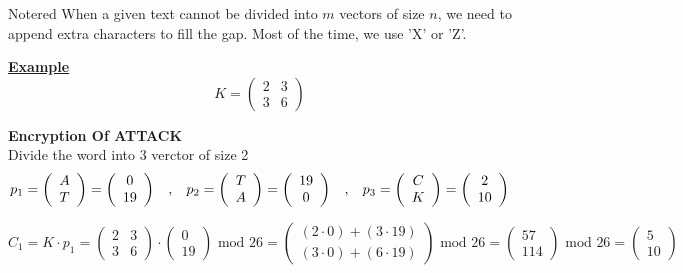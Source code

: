 \newpage

\begin{prettyBox}{Note}{red}
When a given text cannot be divided into \(m\) vectors of size \(n\),  
we need to append extra characters to fill the gap.  
Most of the time, we use 'X' or 'Z'.
\end{prettyBox}

\vspace{1cm}

\textbf{\underline{Example}}\\[0.15cm]
\[K = \begin{pmatrix}
    2 & 3\\
    3 & 6
\end{pmatrix}\]

\textbf{Encryption Of ATTACK}\\[0.15cm]
Divide the word into 3 verctor of size 2
\[
p_1 = \left(\begin{array}{c} A \\ T \end{array}\right) 
= \left(\begin{array}{c} 0 \\ 19 \end{array}\right)
\hspace{0.3cm},\hspace{0.3cm}
p_2 = \left(\begin{array}{c} T \\ A \end{array}\right) 
= \left(\begin{array}{c} 19 \\ 0 \end{array}\right)
\hspace{0.3cm},\hspace{0.3cm}
p_3 = \left(\begin{array}{c} C \\ K \end{array}\right) 
= \left(\begin{array}{c} 2 \\ 10 \end{array}\right)
\]


\[
C_1 = K \cdot p_1 = \begin{pmatrix} 2 & 3 \\ 3 & 6 \end{pmatrix} \cdot \begin{pmatrix} 0 \\ 19
\end{pmatrix} \text{ mod } 26 = \begin{pmatrix} (2 \cdot 0) + (3 \cdot 19) \\ (3 \cdot 0) +
(6 \cdot 19) \end{pmatrix} \text{ mod } 26 = \begin{pmatrix} 57 \\ 114 \end{pmatrix}
\text{ mod } 26 = \boxed{\begin{pmatrix} 5 \\ 10 \end{pmatrix}}
\]

